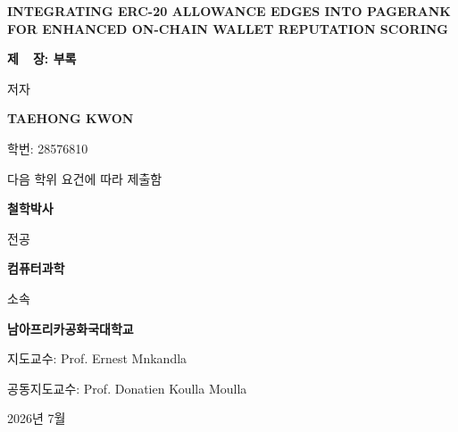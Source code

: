 \ifcase\ChapterOnly\relax
\or
  \def\ChapterCoverTitle{서론 및 연구 문제}%
\or
  \def\ChapterCoverTitle{문헌 검토 및 이론적 틀}%
\or
  \def\ChapterCoverTitle{연구 방법론}%
\or
  \def\ChapterCoverTitle{구현 및 실증 결과}%
\or
  \def\ChapterCoverTitle{논의}%
\or
  \def\ChapterCoverTitle{결론 및 향후 연구}%
\or
  \def\ChapterCoverTitle{참고문헌}%
\or
  \def\ChapterCoverTitle{부록}%
\fi

\begin{titlepage}
\centering
\vspace*{0.4cm}
{\Large\bfseries INTEGRATING ERC-20 ALLOWANCE EDGES INTO PAGERANK FOR ENHANCED ON-CHAIN WALLET REPUTATION SCORING\par}
\vspace{1.2cm}
{\large\bfseries 제~\ChapterOnly~장: \ChapterCoverTitle\par}
\vfill
{저자\par}
\vspace{0.7cm}
{\large\bfseries TAEHONG KWON\par}
\vspace{0.35cm}
{학번: 28576810\par}
\vfill
{다음 학위 요건에 따라 제출함\par}
\vspace{0.7cm}
{\large\bfseries 철학박사\par}
\vspace{0.35cm}
{전공\par}
\vspace{0.7cm}
{\large\bfseries 컴퓨터과학\par}
\vfill
{소속\par}
\vspace{0.7cm}
{\large\bfseries 남아프리카공화국대학교\par}
\vfill
{지도교수: Prof. Ernest Mnkandla\par}
\vspace{0.35cm}
{공동지도교수: Prof. Donatien Koulla Moulla\par}
\vfill
{2026년 7월\par}
\end{titlepage}
\restoregeometry
\ifdefined\ChapterStartPage
  \setcounter{page}{\ChapterStartPage}%
\fi
